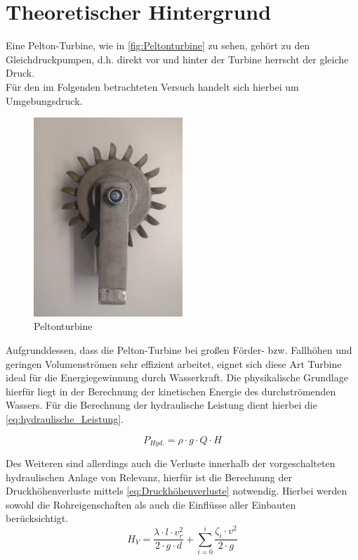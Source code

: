 \section{Theoretischer Hintergrund}
Eine Pelton-Turbine, wie in \autoref{fig:Peltonturbine} zu sehen, gehört zu den Gleichdruckpumpen, d.h. direkt vor und hinter der Turbine herrscht der gleiche
Druck.\\
Für den im Folgenden betrachteten Versuch handelt sich hierbei um Umgebungsdruck.\\
\begin{figure}[H]
    \centering
    \includegraphics[width=0.5\textwidth]{Abbildungen/Peltonturbine.jpeg}
    \caption{Peltonturbine}
    \label{fig:Peltonturbine}
\end{figure}

Aufgrunddessen, dass die Pelton-Turbine bei großen Förder- bzw. Fallhöhen und geringen Volumenströmen sehr effizient arbeitet,
eignet sich diese Art Turbine ideal für die Energiegewinnung durch Wasserkraft.
Die physikalische
Grundlage hierfür liegt in der Berechnung der kinetischen Energie
des durchströmenden Wassers. Für die Berechnung der hydraulische Leistung
dient hierbei die \autoref{eq:hydraulische_Leistung}.

\begin{equation}
    P_{Hyd.} = \rho \cdot g \cdot Q \cdot H
    \label{eq:hydraulische_Leistung}
  \end{equation}

Des Weiteren sind allerdings auch die Verluste innerhalb der vorgeschalteten
hydraulischen Anlage von Relevanz, hierfür ist die Berechnung der
Druckhöhenverluste mittels \autoref{eq:Druckhöhenverluste} notwendig.
Hierbei werden sowohl die Rohreigenschaften als auch die Einflüsse aller Einbauten berücksichtigt.
\begin{equation}
    H_{V} = \frac{\lambda \cdot l \cdot v_{r}^2}{2 \cdot g \cdot d} + \sum_{i=0}^{i} \frac{\zeta_{i} \cdot v^2}{2 \cdot g}
    \label{eq:Druckhöhenverluste}
\end{equation}

